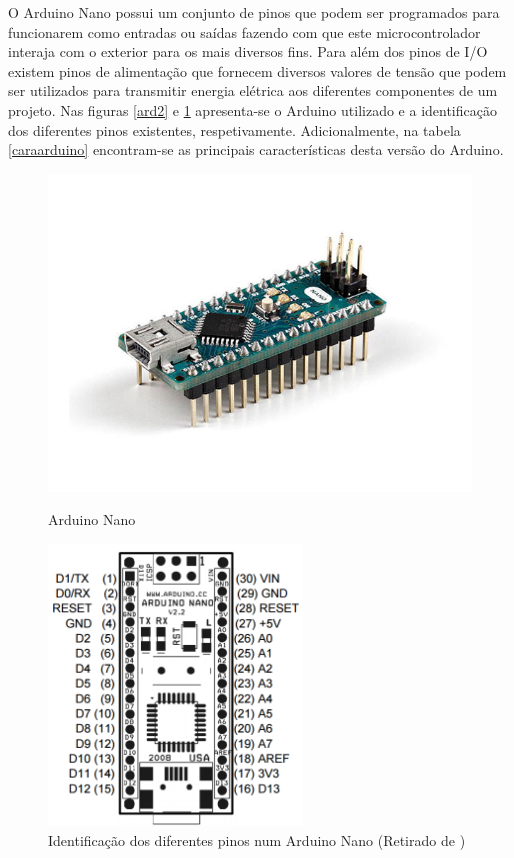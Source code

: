 O Arduino Nano possui um conjunto de pinos que podem ser programados para funcionarem como entradas ou saídas fazendo com que este  microcontrolador interaja com o exterior para os mais diversos fins. Para além dos pinos de \ac{I/O} existem pinos de alimentação que fornecem diversos valores de tensão que podem ser utilizados para transmitir energia elétrica aos diferentes componentes de um projeto\cite{Banzi2012}. Nas figuras \ref{ard2} e \ref{ard1} apresenta-se o Arduino utilizado e a identificação dos diferentes pinos existentes, respetivamente. Adicionalmente, na tabela \ref{caraarduino} encontram-se as principais características desta versão do Arduino.


\newpage
\begin{figure}[h]
	\centering
	\begin{minipage}[b]{0.49\textwidth}
		\centering
		\includegraphics[width=\textwidth]{img/hardware/nano-img.jpg}
		\caption{Arduino Nano}
		\label{ard2}
	\end{minipage}
	\hfill
	\begin{minipage}[b]{0.49\textwidth}
		\centering
		\includegraphics[width=0.6\textwidth]{img/hardware/nano-esquema.png}
		\caption[Identificação dos diferentes pinos num Arduino Nano]{Identificação dos diferentes pinos num Arduino Nano (Retirado de \cite{arduinonanouser})}
		\label{ard1}
	\end{minipage}
\end{figure}





